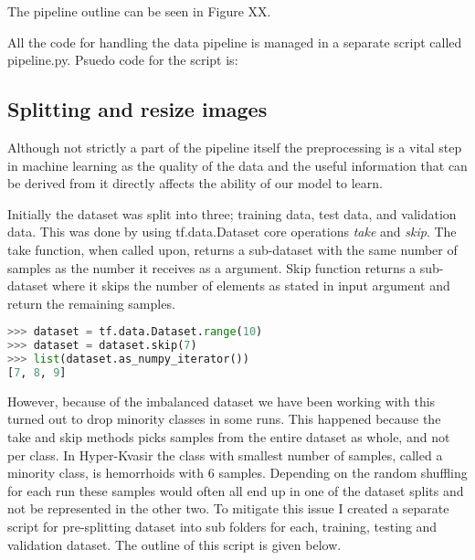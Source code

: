 \documentclass[thesis.tex]{subfiles}
\begin{document}
The pipeline outline can be seen in Figure XX.


All the code for handling the data pipeline is managed in a separate script called pipeline.py. Psuedo code for the script is:



\subsection{Splitting and resize images}
Although not strictly a part of the pipeline itself the preprocessing is a vital step in machine learning as the quality of the data and the useful information that can be derived from it directly affects the ability of our model to learn.

Initially the dataset was split into three; training data, test data, and validation data. This was done by using tf.data.Dataset core operations \textit{take} and \textit{skip}. The take function, when called upon, returns a sub-dataset with the same number of samples as the number it receives as a argument. Skip function returns a sub-dataset where it skips the number of elements as stated in input argument and return the remaining samples.

\begin{lstlisting}[language=Python]
>>> dataset = tf.data.Dataset.range(10)
>>> dataset = dataset.skip(7)
>>> list(dataset.as_numpy_iterator())
[7, 8, 9]
\end{lstlisting}

However, because of the imbalanced dataset we have been working with this turned out to drop minority classes in some runs. This happened because the take and skip methods picks samples from the entire dataset as whole, and not per class. In Hyper-Kvasir the class with smallest number of samples, called a minority class, is hemorrhoids with 6 samples. Depending on the random shuffling for each run these samples would often all end up in one of the dataset splits and not be represented in the other two.
To mitigate this issue I created a separate script for pre-splitting dataset into sub folders for each, training, testing and validation dataset. The outline of this script is given below.
\end{document}
